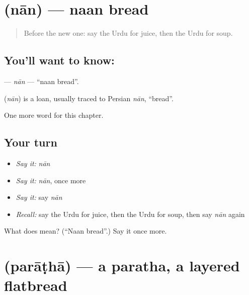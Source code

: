 \section[\texorpdfstring{\ur{نان} (nān)}{نان (nān)}]{ (nān) — naan bread}

\label{lesson:UR-C119-nan}



\begin{quote}
Before the new one: say the Urdu for juice, then the Urdu for soup.
\end{quote}

\subsection*{You'll want to know: }
\textbf{} — \emph{nān} — \textquotedblleft{}naan bread\textquotedblright{}.

\begin{cousinweb}
\textbf{} (\emph{nān}) is a loan, usually traced to Persian \emph{nān}, \textquotedblleft{}bread\textquotedblright{}.
\end{cousinweb}

\begin{grammarlens}[title={What you've built}]
One more word for this chapter.
\end{grammarlens}

\subsection*{Your turn}
\begin{itemize}
\raggedright
  \item \emph{Say it:} \emph{nān}
  \item \emph{Say it:} \emph{nān}, once more
  \item \emph{Say it:} say \emph{nān}
  \item \emph{Recall:} say the Urdu for juice, then the Urdu for soup, then say \emph{nān} again
\end{itemize}

\begin{tcolorbox}[breakable,colback=teal!4,colframe=teal!35!black,title={Before you move on}]
What does  mean? (\textquotedblleft{}Naan bread\textquotedblright{}.) Say it once more.
\end{tcolorbox}
\section[\texorpdfstring{\ur{پراٹھا} (parāṭhā)}{پراٹھا (parāṭhā)}]{ (parāṭhā) — a paratha, a layered flatbread}

